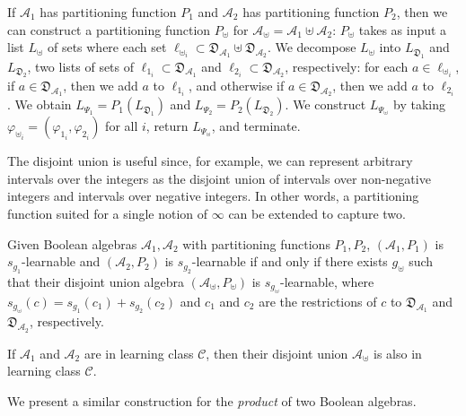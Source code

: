 If $\mathcal{A}_1$ has partitioning function $P_1$
and $\mathcal{A}_2$ has partitioning function $P_2$,
then we can construct a partitioning function $P_\uplus$
for $\mathcal{A}_\uplus = \mathcal{A}_1 \uplus \mathcal{A}_2$:
$P_\uplus$ takes as input a list $L_\uplus$ of sets
where each set $\ell_{\uplus_i} \subset \mathfrak{D}_{\mathcal{A}_1} \uplus \mathfrak{D}_{\mathcal{A}_2}$.
We decompose $L_\uplus$ into $L_{\mathfrak{D}_1}$ and $L_{\mathfrak{D}_2}$, two lists of sets
of $\ell_{1_i} \subset \mathfrak{D}_{\mathcal{A}_1}$
and $\ell_{2_i} \subset \mathfrak{D}_{\mathcal{A}_2}$, respectively:
for each $a \in \ell_{\uplus_i}$, 
if $a \in \mathfrak{D}_{\mathcal{A}_1}$, then we add $a$ to $\ell_{1_i}$, and otherwise
if $a \in \mathfrak{D}_{\mathcal{A}_2}$, then we add $a$ to $\ell_{2_i}$.
We obtain $L_{\Psi_1} = P_1(L_{\mathfrak{D}_1})$
and $L_{\Psi_2} = P_2(L_{\mathfrak{D}_2})$.
We construct $L_{\Psi_\uplus}$ by taking
$\varphi_{\uplus_i} = (\varphi_{1_i}, \varphi_{2_i})$ for all $i$,
return $L_{\Psi_\uplus}$, and terminate.

The disjoint union is useful since, for example,
we can represent arbitrary intervals over the integers
as the disjoint union of \rone intervals over non-negative integers
and \rtwo intervals over negative integers.
In other words, a partitioning function suited
for a single notion of $\infty$ can be extended
to capture two.

\begin{theorem}\label{thm:du}
    Given Boolean algebras $\mathcal{A}_1, \mathcal{A}_2$
    with partitioning functions $P_1, P_2$,
    $(\mathcal{A}_1, P_1)$ is $s_{g_1}$-learnable
    and $(\mathcal{A}_2, P_2)$ is $s_{g_2}$-learnable
    if and only if there exists $g_\uplus$ such that their disjoint union algebra
    $(\mathcal{A}_\uplus, P_\uplus)$ is $s_{g_\uplus}$-learnable,
    where $s_{g_\uplus}(c) = s_{g_1}(c_1) + s_{g_2}(c_2)$
    and $c_1$ and $c_2$ are the restrictions of $c$
    to $\mathfrak{D}_{\mathcal{A}_1}$ and $\mathfrak{D}_{\mathcal{A}_2}$,
    respectively.
\end{theorem}

\begin{corollary}\label{thm:ducor}
    If $\mathcal{A}_1$
    and $\mathcal{A}_2$ are in learning class $\mathcal{C}$,
    then their disjoint union $\mathcal{A}_\uplus$ is also in learning class
    $\mathcal{C}$.
\end{corollary}

We present a similar construction for the \emph{product}
of two Boolean algebras.

